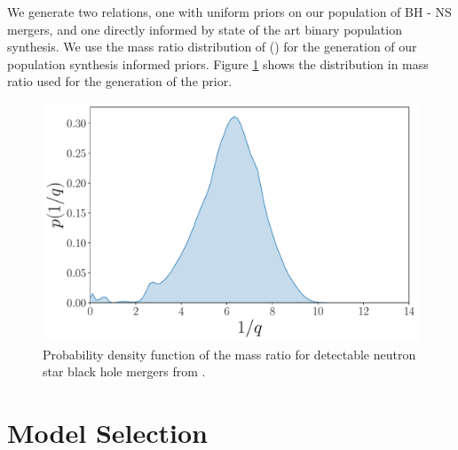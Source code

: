 \documentclass[twocolumn]{aastex631}
\begin{document}
	We generate two relations, one with uniform priors on our population of BH - NS mergers, and one directly informed by state of the art binary population synthesis. We use the mass ratio distribution of \cite{2021Broekgaarden+}  () for the generation of our population synthesis informed priors. Figure \ref{fig:mass ratio distrbution} shows the distribution in mass ratio used for the generation of the prior. 
	\begin{figure}
		\centering
		\includegraphics[width=\linewidth]{NSBH_mass_ratio_density.pdf}
		\caption{Probability density function of the mass ratio for detectable neutron star black hole mergers from \citep{2021Broekgaarden+}.}
		\label{fig:mass ratio distrbution}
	\end{figure}
	\section{Model Selection}\label{sec:Model Selection}
	
	{}
	
	
	
\end{document}
